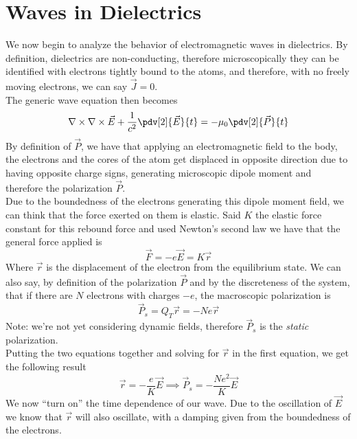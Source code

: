 \documentclass[../electromagnetism.tex]{subfiles}
\begin{document}
\section{Waves in Dielectrics}
We now begin to analyze the behavior of electromagnetic waves in dielectrics. By definition, dielectrics are non-conducting, therefore microscopically they can be identified with electrons tightly bound to the atoms, and therefore, with no freely moving electrons, we can say $\vec{J}=0$.\\
The generic wave equation then becomes
\begin{equation}
	\nabla\times\nabla\times\vec{E}+\frac{1}{c^2}\pdv[2]{\vec{E}}{t}=-\mu_0\pdv[2]{\vec{P}}{t}
	\label{eq:genwavedie.diesol}
\end{equation}
By definition of $\vec{P}$, we have that applying an electromagnetic field to the body, the electrons and the cores of the atom get displaced in opposite direction due to having opposite charge signs, generating microscopic dipole moment and therefore the polarization $\vec{P}$.\\
Due to the boundedness of the electrons generating this dipole moment field, we can think that the force exerted on them is elastic. Said $K$ the elastic force constant for this rebound force and used Newton's second law we have that the general force applied is 
\begin{equation*}
	\vec{F}=-e\vec{E}=K\vec{r}
\end{equation*}
Where $\vec{r}$ is the displacement of the electron from the equilibrium state. We can also say, by definition of the polarization $\vec{P}$ and by the discreteness of the system, that if there are $N$ electrons with charges $-e$, the macroscopic polarization is
\begin{equation*}
	\vec{P}_s=Q_T\vec{r}=-Ne\vec{r}
\end{equation*}
Note: we're not yet considering dynamic fields, therefore $\vec{P}_s$ is the \textit{static} polarization.\\
Putting the two equations together and solving for $\vec{r}$ in the first equation, we get the following result
\begin{equation}
	\vec{r}=-\frac{e}{K}\vec{E}\implies\vec{P}_s=-\frac{Ne^2}{K}\vec{E}
	\label{eq:staticpol.diesol}
\end{equation}
We now ``turn on'' the time dependence of our wave. Due to the oscillation of $\vec{E}$ we know that $\vec{r}$ will also oscillate, with a damping given from the boundedness of the electrons.\\
\end{document}
